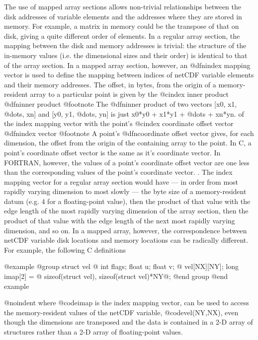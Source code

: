 The use of mapped array sections allows non-trivial relationships
between the disk
addresses of variable elements and the addresses where they are stored in
memory.
For example, a matrix in memory could be the transpose of that on disk,
giving a quite different order of elements.
In a regular array section, the mapping between the disk and memory addresses
is trivial: the structure of the in-memory values (i.e. the dimensional
sizes and their order) is identical to that of the array section.  In a
mapped array section, however, an @dfn{index mapping vector} is used to
define the mapping between indices of netCDF variable elements and
their memory addresses.  The offset, in bytes,
from the origin of a memory-resident array to a particular point is
given by the
@cindex inner product
@dfn{inner product}
@footnote{
The @dfn{inner product} of two vectors
[x0, x1, @dots{}, xn] and [y0, y1, @dots{}, yn] is just x0*y0 + x1*y1 + @dots{} +
xn*yn.
}
of the index mapping vector with the point's
@cindex coordinate offset vector
@dfn{index vector}
@footnote{
A point's @dfn{coordinate offset vector} gives,
for each dimension, the offset from the origin of the containing array
to the point.
In C, a point's coordinate offset vector is the same as it's coordinate
vector.
In FORTRAN, however, the values of a point's coordinate offset vector
are one less than the corresponding values of the point's coordinate vector.
}
.
The index
mapping vector for a regular array section would have --- in order from most
rapidly varying dimension to most slowly --- the byte size of a
memory-resident datum (e.g. 4 for a floating-point value), then the
product of that value with the edge length of the most rapidly varying
dimension of the array section, then the product of that value with the edge
length of the next most rapidly varying dimension, and so on.  In a
mapped array, however, the correspondence between netCDF variable
disk locations
and memory locations can be radically different.  For example, the
following C definitions

@example
@group
struct vel @{
    int flags;
    float u;
    float v;
@} vel[NX][NY];
long imap[2] = @{
    sizeof(struct vel),
    sizeof(struct vel)*NY@};
@end group
@end example

@noindent
where @code{imap} is the index mapping vector,
can be used to access the memory-resident values of the netCDF variable,
@code{vel(NY,NX)}, even
though the dimensions are transposed and the data is contained in a 2-D array
of structures rather than a 2-D array of floating-point values.

